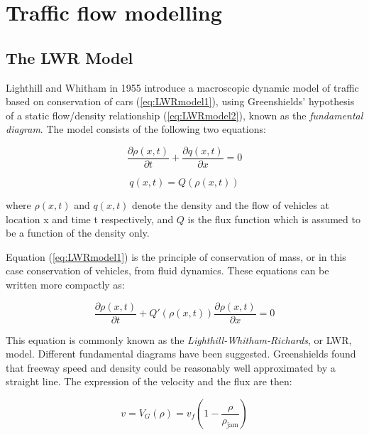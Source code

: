 \section{Traffic flow modelling}

\subsection{The LWR Model}

Lighthill and Whitham in 1955 \cite{Lighthill1955} introduce a macroscopic dynamic model of traffic based on conservation of cars (\ref{eq:LWRmodel1}), using Greenshields' hypothesis \cite{Greenshields1934} of a static flow/density relationship (\ref{eq:LWRmodel2}), known as the \textit{fundamental diagram}. The model consists of the following two equations:

\begin{equation} \label{eq:LWRmodel1}
\frac{\partial \rho(x,t)}{\partial t} + \frac{\partial q(x,t)}{\partial x} = 0
\end{equation}

\begin{equation} \label{eq:LWRmodel2}
q(x,t) = Q(\rho(x,t))
\end{equation}

\noindent where $\rho(x,t)$ and $q(x,t)$ denote the density and the flow of vehicles at location x and time t respectively, and $Q$ is the flux function which is assumed to be a function of the density only. 

Equation (\ref{eq:LWRmodel1}) is the principle of conservation of mass, or in this case conservation of vehicles, from fluid dynamics. These equations can be written more compactly as:

\begin{equation} \label{eq:LWRmodel3}
\frac{\partial \rho(x,t)}{\partial t} + Q'(\rho(x,t))\frac{\partial \rho(x,t)}{\partial x} = 0
\end{equation}

This equation is commonly known as the \textit{Lighthill-Whitham-Richards}, or LWR, model. Different fundamental diagrams have been suggested. Greenshields \cite{Greenshields1934} found that freeway speed and density could be reasonably well approximated by a straight line. The expression of the velocity and the flux are then:

\begin{equation} \label{eq:greenshieldsVelocity}
v = V_{G}(\rho) = v_{f}(1-\frac{\rho}{\rho_{\text{jam}}})
\end{equation}

